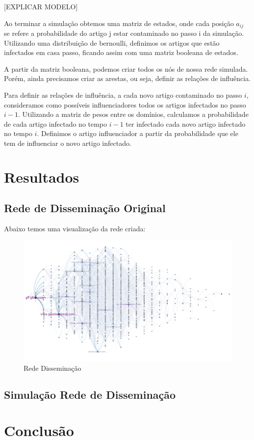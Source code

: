 \documentclass[a4paper,12pt]{article}
\begin{document}
   [EXPLICAR MODELO]
  
  Ao terminar a simulação obtemos uma matriz de estados, onde cada posição $a_{ij}$ se refere a probabilidade do artigo
  j estar contaminado no passo i da simulação. Utilizando uma distribuição de bernoulli, definimos os artigos que estão infectados
  em casa passo, ficando assim com uma matriz booleana de estados.
  
  A partir da matriz booleana, podemos criar todos os nós de nossa rede simulada. Porém, ainda precisamos criar as arestas, ou seja, definir
  as relações de influência. 
  
  Para definir as relações de influência, a cada novo artigo contaminado no passo $i$, consideramos como possíveis influenciadores todos os artigos
  infectados no passo $i-1$. Utilizando a matriz de pesos entre os domínios, calculamos a probabilidade de cada artigo infectado no tempo
  $i-1$ ter infectado cada novo artigo infectado no tempo $i$. Definimos o artigo influenciador a partir da probabilidade que ele tem de 
  influenciar o novo artigo infectado. 

  
  
\section{Resultados}
 


\subsection{Rede de Disseminação Original}

Abaixo temos uma visualização da
 rede criada:

\begin{figure}[h]
 \centering
 \includegraphics[scale=0.4]{../results/a.png}
 \caption{Rede Disseminação}
\end{figure}



\subsection{Simulação Rede de Disseminação}


\section{Conclusão}
\end{document}
